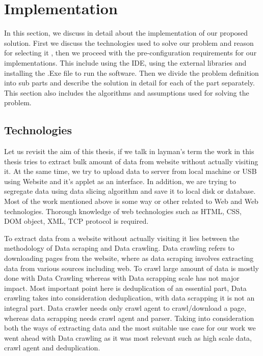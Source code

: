 \documentclass[article,type=msc,colorback,accentcolor=tud9c,twoside,11pt]{tudthesis}
\begin{document}
\clearpage

\section{Implementation}
In this section, we discuss in detail about the implementation of our proposed solution. First we discuss the technologies used to solve our problem and reason for selecting it , then we proceed with the pre-configuration requirements for our implementations. This include using the IDE, using the external libraries and installing the .Exe file to run the software. Then we divide the problem definition into sub parts and describe the solution in detail for each of the part separately. This section also includes the algorithms and assumptions used for solving the problem.

\subsection{Technologies}
Let us revisit the aim of this thesis, if we talk in layman's term the work in this thesis tries to extract bulk amount of data from website without actually visiting it. At the same time, we try to upload data to server from local machine or USB using Website and it's applet as an interface. In addition, we are trying to segregate data using data slicing algorithm and save it to local disk or database. Most of the work mentioned above is some way or other related to Web and Web technologies. Thorough knowledge of web technologies such as HTML, CSS, DOM object, XML, TCP protocol is required.

To extract data from a website without actually visiting it lies between the methodology of Data scraping and Data crawling. Data crawling refers to downloading pages from the website, where as data scraping involves extracting data from various sources including web. To crawl  large amount of data is mostly done with Data Crawling whereas with Data scrapping scale has not major impact. Most important point here is deduplication of an essential part, Data crawling takes into consideration deduplication, with data scrapping it is not an integral part. Data crawler needs only crawl agent to crawl/download a page, whereas data scrapping needs crawl agent and parser. Taking into consideration both the ways of extracting data and the most suitable use case for our work we went ahead with Data crawling as it was most relevant such as high scale data, crawl agent and deduplication.
\end{document}
